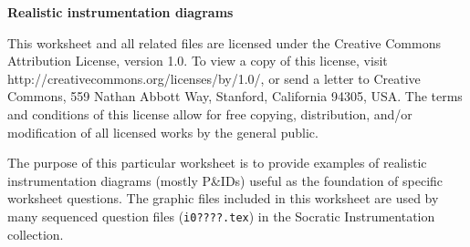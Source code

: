 
\centerline{\bf Realistic instrumentation diagrams} \bigskip 
 
This worksheet and all related files are licensed under the Creative Commons Attribution License, version 1.0.  To view a copy of this license, visit http://creativecommons.org/licenses/by/1.0/, or send a letter to Creative Commons, 559 Nathan Abbott Way, Stanford, California 94305, USA.  The terms and conditions of this license allow for free copying, distribution, and/or modification of all licensed works by the general public.

\vskip 10pt

The purpose of this particular worksheet is to provide examples of realistic instrumentation diagrams (mostly P\&IDs) useful as the foundation of specific worksheet questions.  The graphic files included in this worksheet are used by many sequenced question files ({\tt i0????.tex}) in the Socratic Instrumentation collection.



\vfil \eject

